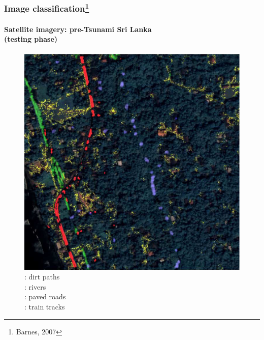 \begin{frame}
\frametitle{Image classification\footnote{Barnes, 2007}}
\framesubtitle{\small Satellite imagery: pre-Tsunami Sri Lanka\\(testing phase)}
\mypagenum
	\begin{figure}		
		\includegraphics[height=0.5\textheight]{thesis/RVQ_SatelliteSriLanka_3_labeling.png}
		\caption{: dirt paths \\: rivers \\: paved roads \\: train tracks}
	\end{figure}
\end{frame}



